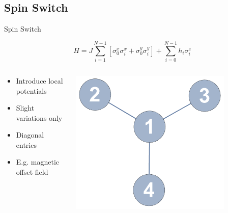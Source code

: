 \documentclass{beamer}
\begin{document}
\subsection{Spin Switch}
\begin{frame}[t]{Spin Switch}
	\begin{exampleblock}{}
	\setlength\abovedisplayskip{-8pt}
	\begin{center}
		\[ H = J\sum_{i=1}^{N-1}\left[\sigma_0^x\sigma_i^x + \sigma_0^y\sigma_i^y\right] + \sum_{i=0}^{N-1}h_i\sigma_i^z \]
	\end{center}
	\end{exampleblock}
	\begin{columns}[T]
		\begin{column}{0.5\textwidth}
			\centering
   			\begin{itemize}
				\item Introduce local potentials
				\item Slight variations only
				\item Diagonal entries 
				\item E.g. magnetic offset field
			\end{itemize}
		\end{column}
		\begin{column}{0.5\textwidth}
			\centering
    		\includegraphics[trim=0mm 0 0 0mm, width=0.8\textwidth]{Images/switch_labeled}
		\end{column}
	\end{columns}
\end{frame}
\end{document}

